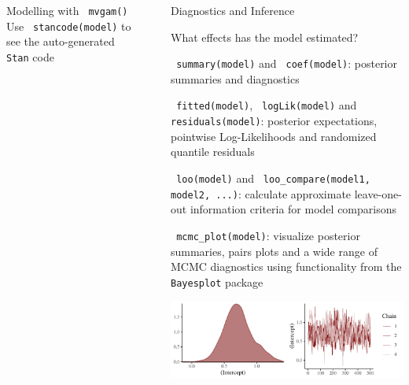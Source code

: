 \documentclass[final,9pt,fleqn]{beamer}\usepackage[]{graphicx}\usepackage[]{xcolor}
\makeatletter
\def\maxwidth{ %
  \ifdim\Gin@nat@width>\linewidth
    \linewidth
  \else
    \Gin@nat@width
  \fi
}
\newenvironment{knitrout}{}{} %
\makeatother
\begin{document}
\begin{frame}[fragile]
\begin{columns}
\begin{column}{0.3\paperwidth}
\begin{block}{{\fontsize{21}{21} \selectfont \color{BrickRed} Modelling with \texttt{\color{Orchid} mvgam()}}}
Use \texttt{\color{Orchid} stancode(model)} to see the auto-generated \texttt{Stan} code

\end{block}
\end{column}


\begin{column}{.03\paperwidth}
\end{column}


\begin{column}{0.3\paperwidth}
\vspace{0.52in}
\noindent\makebox[\linewidth]{\rule{0.3\paperwidth}{0.2pt}}
\begin{block}{{\fontsize{21}{21} \selectfont \color{BrickRed} Diagnostics and Inference}}

\smallskip
{{\fontsize{11}{11} \selectfont \color{mygray} What effects has the model estimated?}}

\medskip
\texttt{\color{Orchid} summary(model)} and \texttt{\color{Orchid} coef(model)}: posterior summaries and diagnostics

\medskip
\texttt{\color{Orchid} fitted(model)}, \texttt{\color{Orchid} logLik(model)} and \texttt{\color{Orchid} residuals(model)}: posterior expectations, pointwise Log-Likelihoods and randomized quantile residuals

\medskip
\texttt{\color{Orchid} loo(model)} and \texttt{\color{Orchid} loo\_compare(model1, model2, ...)}: calculate approximate leave-one-out information criteria for model comparisons

\medskip
\texttt{\color{Orchid} mcmc\_plot(model)}: visualize posterior summaries, pairs plots and a wide range of MCMC diagnostics using functionality from the \texttt{Bayesplot} package

\begin{knitrout}
\color{fgcolor}

{\centering \includegraphics[width=\maxwidth]{figure/unnamed-chunk-4-1} 

}



\end{knitrout}
\end{block}
\end{column}
\end{columns}
\end{frame}
\end{document}
